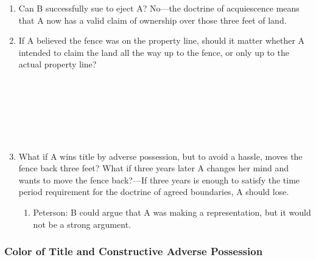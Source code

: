 \begin{enumerate}
    \begin{enumerate}
        \item Can B successfully sue to eject A? No---the doctrine of 
        acquiescence means that A now has a valid claim of ownership over 
        those three feet of land.
        \item If A believed the fence was on the property line, should it 
        matter whether A intended to claim the land all the way up to the 
        fence, or only up to the actual property line?
        ~\\\\\\\\\\\\\\%
        \item What if A wins title by adverse possession, but to avoid a 
        hassle, moves the fence back three feet? What if three years later A 
        changes her mind and wants to move the fence back?---If three years is 
        enough to satisfy the time period requirement for the doctrine of 
        agreed boundaries, A should lose.
        \begin{enumerate}
            \item Peterson: B could argue that A was making a representation, 
            but it would not be a strong argument. %
        \end{enumerate}
    \end{enumerate}
\end{enumerate}

\subsubsection{Color of Title and Constructive Adverse Possession}

